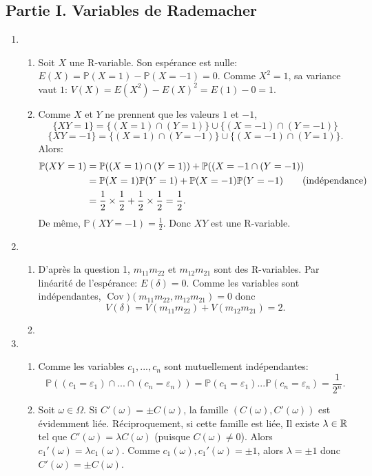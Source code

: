 \subsection*{Partie I. Variables de Rademacher}

\begin{enumerate}
 \item \begin{enumerate}
            \item Soit $X$ une R-variable. Son espérance est nulle: $E(X) = \mathbb{P}(X=1) - \mathbb{P}(X=-1) = 0$. Comme $X^{2} = 1$, sa variance vaut $1$: $V(X) = E(X^{2}) - E(X)^{2} = E(1) - 0 = 1$.
            \item Comme $X$ et $Y$ ne prennent que les valeurs $1$ et $-1$, 
           \[ \{ XY = 1 \} = \{ (X = 1)\cap (Y = 1)\} \cup \{ (X = -1)\cap (Y=-1)\}\]
           \[\{ XY = -1 \} = \{ (X = 1)\cap (Y = -1)\}\cup \{ (X = -1) \cap (Y = 1)\}.\]
           Alors:
           \begin{align}
            \mathbb{P}(XY = 1) & = \mathbb{P}((X=1) \cap (Y = 1)) + \mathbb{P}((X = -1\cap (Y = -1))\notag\\
             & = \mathbb{P}(X = 1)\mathbb{P}(Y = 1) + \mathbb{P}( X= -1)\mathbb{P}(Y = -1)\qquad \text{(indépendance)}\notag\\
             & = \frac{1}{2}\times \frac{1}{2} + \frac{1}{2}\times \frac{1}{2} 
              = \frac{1}{2}.
           \end{align}
          De même, $\displaystyle{\mathbb{P}(XY = -1) = \frac{1}{2}}$. Donc $XY$ est une R-variable.
           \end{enumerate}
           

\item \begin{enumerate}
       \item D'après la question 1, $m_{11}m_{22}$ et $m_{12}m_{21}$ sont des R-variables. Par linéarité de l'espérance: $E(\delta) = 0$. Comme les variables sont indépendantes,
       $\mathop{\mathrm{Cov}})(m_{11}m_{22},m_{12}m_{21})=0$ donc
       \[
        V(\delta) = V(m_{11}m_{22}) + V(m_{12}m_{21}) =2.
       \]
       \item 
      \end{enumerate}


\item \begin{enumerate}
           \item Comme les variables $c_{1}, ..., c_{n}$ sont mutuellement indépendantes:
           \[ \mathbb{P}((c_{1} = \varepsilon_{1}) \cap ... \cap (c_{n}= \varepsilon_{n})) = \mathbb{P}(c_{1} = \varepsilon_{1}) ... \mathbb{P}(c_{n} = \varepsilon_{n}) = \frac{1}{2^{n}}.\]
           \item Soit $\omega \in \Omega$. Si $C'(\omega) = \pm C(\omega)$, la famille $(C(\omega), C'(\omega))$ est évidemment liée. Réciproquement, si cette famille est liée, Il existe $\lambda \in \mathbb{R}$ tel que $C'(\omega) = \lambda C(\omega)$
           (puisque $C(\omega)\neq 0$). Alors $c_{1}'(\omega) = \lambda c_{1}(\omega)$. Comme $c_{1}(\omega), c_{1}'(\omega) = \pm 1$, alors $\lambda = \pm 1$ donc $C'(\omega) = \pm C(\omega)$.
           

\end{enumerate}
\end{enumerate}
